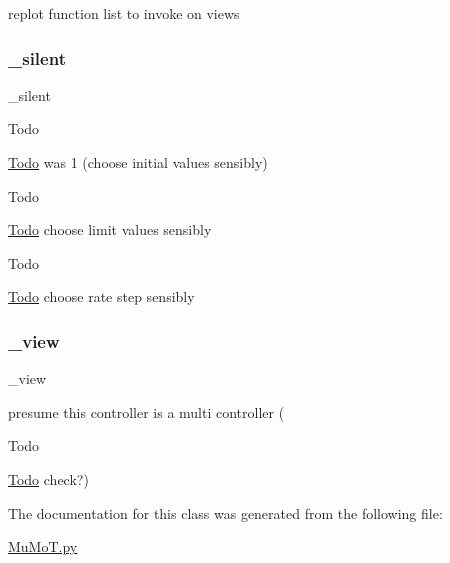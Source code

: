 replot function list to invoke on views 

\mbox{\label{class_mu_mo_t_1_1_mu_mo_tmulti_controller_a909146a3c119c927727c7d533042b184}} 
\subsubsection{\texorpdfstring{\+\_\+silent}{\_silent}}
{\footnotesize\ttfamily \+\_\+silent\hspace{0.3cm}{\ttfamily [private]}}

\begin{DoxyRefDesc}{Todo}
\item[\hyperlink{todo__todo000022}{Todo}]was 1 (choose initial values sensibly) \end{DoxyRefDesc}
\begin{DoxyRefDesc}{Todo}
\item[\hyperlink{todo__todo000023}{Todo}]choose limit values sensibly \end{DoxyRefDesc}
\begin{DoxyRefDesc}{Todo}
\item[\hyperlink{todo__todo000024}{Todo}]choose rate step sensibly \end{DoxyRefDesc}
\mbox{\label{class_mu_mo_t_1_1_mu_mo_tmulti_controller_a27dd8543b5188cdfe40f622d267fe2c5}} 
\subsubsection{\texorpdfstring{\+\_\+view}{\_view}}
{\footnotesize\ttfamily \+\_\+view\hspace{0.3cm}{\ttfamily [private]}}



presume this controller is a multi controller ( 

\begin{DoxyRefDesc}{Todo}
\item[\hyperlink{todo__todo000025}{Todo}]check?) \end{DoxyRefDesc}


The documentation for this class was generated from the following file\+:\begin{DoxyCompactItemize}
\item 
\hyperlink{_mu_mo_t_8py}{Mu\+Mo\+T.\+py}\end{DoxyCompactItemize}
